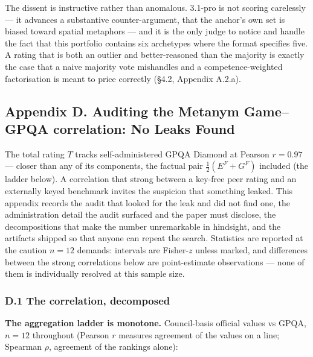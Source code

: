 The dissent is instructive rather than anomalous. 3.1-pro is not scoring carelessly --- it advances a substantive counter-argument, that the anchor's own set is biased toward spatial metaphors --- and it is the only judge to notice and handle the fact that this portfolio contains six archetypes where the format specifies five. A rating that is both an outlier and better-reasoned than the majority is exactly the case that a naive majority vote mishandles and a competence-weighted factorisation is meant to price correctly (§4.2, Appendix A.2.a).

\subsection{Appendix D. Auditing the Metanym Game--GPQA correlation: No Leaks Found}\label{appendix-d.-auditing-the-metanym-gamegpqa-correlation-no-leaks-found}

The total rating \(T\) tracks self-administered GPQA Diamond at Pearson \(r = 0.97\) --- closer than any of its components, the factual pair \(\tfrac12(E^{F}+G^{F})\) included (the ladder below). A correlation that strong between a key-free peer rating and an externally keyed benchmark invites the suspicion that something leaked. This appendix records the audit that looked for the leak and did not find one, the administration detail the audit surfaced and the paper must disclose, the decompositions that make the number unremarkable in hindsight, and the artifacts shipped so that anyone can repeat the search. Statistics are reported at the caution \(n = 12\) demands: intervals are Fisher-\(z\) unless marked, and differences between the strong correlations below are point-estimate observations --- none of them is individually resolved at this sample size.

\subsubsection{D.1 The correlation, decomposed}\label{d.1-the-correlation-decomposed}

\textbf{The aggregation ladder is monotone.} Council-basis official values vs GPQA, \(n = 12\) throughout (Pearson \(r\) measures agreement of the values on a line; Spearman \(\rho\), agreement of the rankings alone):

